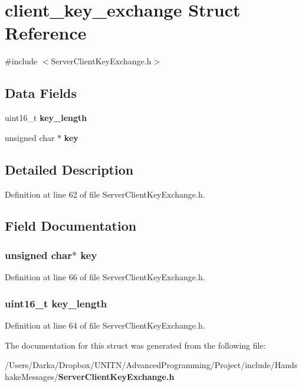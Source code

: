 \section{client\+\_\+key\+\_\+exchange Struct Reference}
\label{structclient__key__exchange}


{\ttfamily \#include $<$Server\+Client\+Key\+Exchange.\+h$>$}

\subsection*{Data Fields}
\begin{DoxyCompactItemize}
\item 
uint16\+\_\+t {\bf key\+\_\+length}
\item 
unsigned char $\ast$ {\bf key}
\end{DoxyCompactItemize}


\subsection{Detailed Description}


Definition at line 62 of file Server\+Client\+Key\+Exchange.\+h.



\subsection{Field Documentation}
\subsubsection[{key}]{\setlength{\rightskip}{0pt plus 5cm}unsigned char$\ast$ key}\label{structclient__key__exchange_a1cb5ee363f3d6d0f548eb6e64d72a7c8}


Definition at line 66 of file Server\+Client\+Key\+Exchange.\+h.

\subsubsection[{key\+\_\+length}]{\setlength{\rightskip}{0pt plus 5cm}uint16\+\_\+t key\+\_\+length}\label{structclient__key__exchange_aaca3c65525352f552124c3d947b60dcb}


Definition at line 64 of file Server\+Client\+Key\+Exchange.\+h.



The documentation for this struct was generated from the following file\+:\begin{DoxyCompactItemize}
\item 
/\+Users/\+Darka/\+Dropbox/\+U\+N\+I\+T\+N/\+Advanced\+Programming/\+Project/include/\+Handshake\+Messages/{\bf Server\+Client\+Key\+Exchange.\+h}\end{DoxyCompactItemize}
